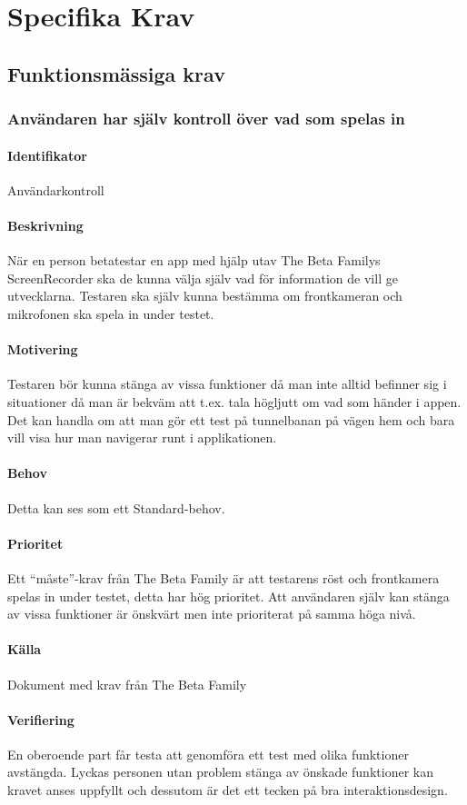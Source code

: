 \section{Specifika Krav}

\subsection{Funktionsmässiga krav}
\subsubsection{Användaren har själv kontroll över vad som spelas in}
\paragraph{Identifikator} 
Användarkontroll
\paragraph{Beskrivning}
När en person betatestar en app med hjälp utav The Beta Familys ScreenRecorder ska de kunna välja själv vad för information de vill ge utvecklarna. Testaren ska själv kunna bestämma om frontkameran och mikrofonen ska spela in under testet. 
\paragraph{Motivering}
Testaren bör kunna stänga av vissa funktioner då man inte alltid befinner sig i situationer då man är bekväm att t.ex. tala högljutt om vad som händer i appen. Det kan handla om att man gör ett test på tunnelbanan på vägen hem och bara vill visa hur man navigerar runt i applikationen.
\paragraph{Behov}
Detta kan ses som ett Standard-behov.
\paragraph{Prioritet}
Ett ``måste''-krav från The Beta Family är att testarens röst och frontkamera spelas in under testet, detta har hög prioritet. Att användaren själv kan stänga av vissa funktioner är önskvärt men inte prioriterat på samma höga nivå.
\paragraph{Källa}
Dokument med krav från The Beta Family
\paragraph{Verifiering}
En oberoende part får testa att genomföra ett test med olika funktioner avstängda. Lyckas personen utan problem stänga av önskade funktioner kan kravet anses uppfyllt och dessutom är det ett tecken på bra interaktionsdesign.

